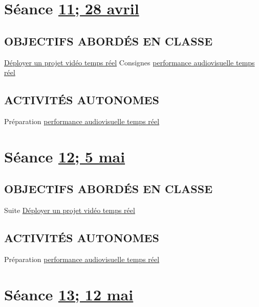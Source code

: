 \documentclass[
  french,
]{book}
\begin{document}
\hypertarget{semaine_13}{%
\section{\texorpdfstring{Séance \protect\hyperlink{semaine_13}{11; 28 avril}}{Séance 11; 28 avril}}\label{semaine_13}}

\hypertarget{objectifs-aborduxe9s-en-classe-12}{%
\subsection{OBJECTIFS ABORDÉS EN CLASSE}\label{objectifs-aborduxe9s-en-classe-12}}

\protect\hyperlink{deployer}{Déployer un projet vidéo temps réel}
Consignes \protect\hyperlink{sommatif_5}{performance audiovisuelle temps réel}

\hypertarget{activituxe9s-autonomes-12}{%
\subsection{ACTIVITÉS AUTONOMES}\label{activituxe9s-autonomes-12}}

Préparation \protect\hyperlink{sommatif_5}{performance audiovisuelle temps réel}

\hypertarget{semaine_14}{%
\section{\texorpdfstring{Séance \protect\hyperlink{semaine_14}{12; 5 mai}}{Séance 12; 5 mai}}\label{semaine_14}}

\hypertarget{objectifs-aborduxe9s-en-classe-13}{%
\subsection{OBJECTIFS ABORDÉS EN CLASSE}\label{objectifs-aborduxe9s-en-classe-13}}

Suite \protect\hyperlink{deployer}{Déployer un projet vidéo temps réel}

\hypertarget{activituxe9s-autonomes-13}{%
\subsection{ACTIVITÉS AUTONOMES}\label{activituxe9s-autonomes-13}}

Préparation \protect\hyperlink{sommatif_5}{performance audiovisuelle temps réel}

\hypertarget{semaine_15}{%
\section{\texorpdfstring{Séance \protect\hyperlink{semaine_15}{13; 12 mai}}{Séance 13; 12 mai}}\label{semaine_15}}
\end{document}
